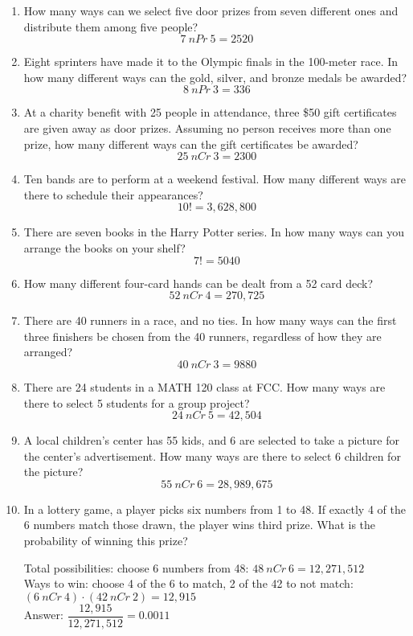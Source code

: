 \begin{enumerate}
\item How many ways can we select five door prizes from seven different ones and distribute them among five people? 
\[7\ nPr\ 5 = 2520\]

\item Eight sprinters have made it to the Olympic finals in the 100-meter race. In how many different ways can the gold, silver, and bronze medals be awarded? 
\[8\ nPr\ 3 = 336\]

\item At a charity benefit with 25 people in attendance, three \$50 gift certificates are given away as door prizes. Assuming no person receives more than one prize, how many different ways can the gift certificates be awarded? 
\[25\ nCr\ 3 = 2300\]

\item Ten bands are to perform at a weekend festival. How many different ways
are there to schedule their appearances? 
\[10! = 3,628,800\]

\item There are seven books in the Harry Potter series. In how many ways can you arrange the books on your shelf? 
\[7! = 5040\]

\item How many different four-card hands can be dealt from a 52 card deck? 
\[52\ nCr\ 4 = 270,725\]

\item There are 40 runners in a race, and no ties. In how many ways can the first three finishers be chosen from the 40 runners, regardless of how they are arranged? 
\[40\ nCr\ 3 = 9880\]

\item There are 24 students in a MATH 120 class at FCC. How many ways are there to select 5 students for a group project? 
\[24\ nCr\ 5 = 42,504\]

\item A local children's center has 55 kids, and 6 are selected to take a picture for the center's advertisement. How many ways are there to select 6 children for the picture? 
\[55\ nCr\ 6 = 28,989,675\]
\pagebreak

\item In a lottery game, a player picks six numbers from 1 to 48. If exactly 4 of the 6 numbers match those drawn, the player wins third prize. What is the probability of winning this prize? 
\begin{center}
Total possibilities: choose 6 numbers from 48: $48\ nCr\ 6 = 12,271,512$\\
Ways to win: choose 4 of the 6 to match, 2 of the 42 to not match: $(6\ nCr\ 4) \cdot (42\ nCr\ 2) = 12,915$\\
Answer: $\dfrac{12,915}{12,271,512} = 0.0011$
\end{center}


\end{enumerate}
